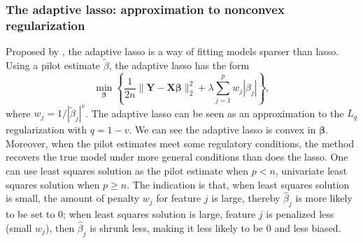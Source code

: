 \subsubsection{The adaptive lasso: approximation to nonconvex regularization}
Proposed by \cite{zou2006adaptive}, the adaptive lasso is a way of fitting models sparser than lasso. Using a pilot estimate $\tilde{\beta}$, the adaptive lasso has the form
\begin{equation}
    \min_{\bm{\beta}} \left\{ \frac{1}{2n}\|\bm{Y}-\bm{X\beta}\|_2^2+\lambda\sum_{j=1}^pw_j|\beta_j| \right\}, \label{eq1.20}
\end{equation}
where $w_j=1/|\tilde{\beta}_j|^v$. The adaptive lasso can be seen as an approximation to the $L_q$ regularization with $q=1-v$. We can see the adaptive lasso is convex in $\bm{\beta}$. Moreover, when the pilot estimates meet some regulatory conditions, the method recovers the true model under more general conditions than does the lasso. One can use least squares solution as the pilot estimate when $p<n$, univariate least squares solution when $p\geq n$. The indication is that, when least squares solution is small, the amount of penalty $w_j$ for feature $j$ is large, thereby $\hat{\beta}_j$ is more likely to be set to 0; when least squares solution is large, feature $j$ is penalized less (small $w_j$), then $\hat{\beta}_j$ is shrunk less, making it less likely to be 0 and less biased.

